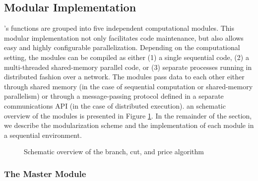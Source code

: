 \subsection{Modular Implementation}

\BB's functions are grouped into five independent computational
modules. This modular implementation not only facilitates code
maintenance, but also allows easy and highly configurable
parallelization. Depending on the computational setting, the modules
can be compiled as either (1) a single sequential code, (2) a
multi-threaded shared-memory parallel code, or (3) separate processes
running in distributed fashion over a network. The modules pass data
to each other either through shared memory (in the case of sequential
computation or shared-memory parallelism) or through a message-passing
protocol defined in a separate communications API (in the case of
distributed execution). an schematic overview of the modules is
presented in Figure \ref{overview}. In the remainder of the section,
we describe the modularization scheme and the implementation of each
module in a sequential environment. 

\begin{figure}
\centering
{}
\caption{Schematic overview of the branch, cut, and price algorithm}
\label{overview}
\end{figure}

\subsubsection{The Master Module}
\label{master-process}


